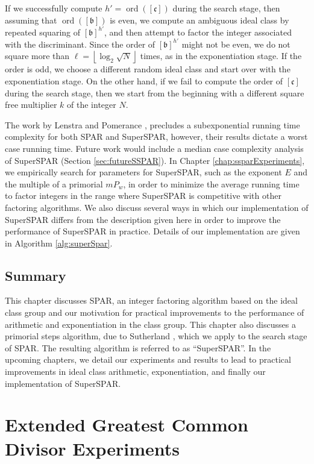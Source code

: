 \documentclass{ucalgthes1}
\theoremstyle{definition}
\DeclareMathOperator{\ord}{ord}
\newcommand{\floor}[1]{\left\lfloor #1 \right\rfloor}
\newcommand{\ideal}{\mathfrak}
\newcommand{\idealclass}[1]{\left[ \ideal #1 \right]}
\newcommand{\bclass}{\idealclass b}
\newcommand{\cclass}{\idealclass c}
\begin{document}
If we successfully compute $h' = \ord(\cclass)$ during the search stage, then assuming that $\ord(\bclass)$ is even, we compute an ambiguous ideal class by repeated squaring of $\bclass^{h'}$, and then attempt to factor the integer associated with the discriminant.  Since the order of $\bclass^{h'}$ might not be even, we do not square more than $\ell = \floor{\log_2{\sqrt N}}$ times, as in the exponentiation stage.  If the order is odd, we choose a different random ideal class and start over with the exponentiation stage.  On the other hand, if we fail to compute the order of $\cclass$ during the search stage, then we start from the beginning with a different square free multiplier $k$ of the integer $N$.

The work by Lenstra and Pomerance \cite[\S 11]{Lenstra1992}, precludes a subexponential running time complexity for both SPAR and SuperSPAR, however, their results dictate a worst case running time.  Future work would include a median case complexity analysis of SuperSPAR (Section \ref{sec:futureSSPAR}).  In Chapter \ref{chap:ssparExperiments}, we empirically search for parameters for SuperSPAR, such as the exponent $E$ and the multiple of a primorial $mP_w$, in order to minimize the average running time to factor integers in the range where SuperSPAR is competitive with other factoring algorithms.  We also discuss several ways in which our implementation of SuperSPAR differs from the description given here in order to improve the performance of SuperSPAR in practice.  Details of our implementation are given in Algorithm \ref{alg:superSpar}.

\section{Summary}

This chapter discusses SPAR, an integer factoring algorithm based on the ideal class group and our motivation for practical improvements to the performance of arithmetic and exponentiation in the class group.  This chapter also discusses a primorial steps algorithm, due to Sutherland \cite{Sutherland2007}, which we apply to the search stage of SPAR.   The resulting algorithm is referred to as ``SuperSPAR''.   In the upcoming chapters, we detail our experiments and results to lead to practical improvements in ideal class arithmetic, exponentiation, and finally our implementation of SuperSPAR.


\chapter{Extended Greatest Common Divisor Experiments}
\label{chap:xgcdExperiments}
\end{document}
